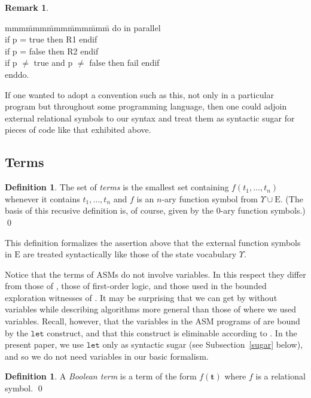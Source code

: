 \documentclass{LMCS}
\theoremstyle{definition}
\newtheorem{df}[thm]{Definition}
\newtheorem{rmk}[thm]{Remark}
\newenvironment{eatab}
 {\bigskip\noindent\begin{minipage}{\textwidth}\upshape\ttfamily
  \begin{tabbing}mmm\=mmm\=mmm\=mmm\=mmm\=\kill}
 {\end{tabbing}\end{minipage}\bigskip}
\newcommand{\E}{\mathrm{E}}
\newcommand{\U}{\Upsilon}
\newcommand{\bld}[1]{\ensuremath{\mathbf {#1}}}
\newcommand{\ttt}[1]{\ensuremath{\mathtt {#1}}}
\begin{document}
\begin{rmk}
  \begin{eatab}
     do in parallel\\
     \> if p = true then R1 endif\\
     \> if p = false then R2 endif\\
     \> if p $\ne$ true and p $\ne$ false then fail endif\\
     enddo.  \end{eatab}

If one wanted to adopt a convention such as this, not only in a
particular program but throughout some programming language, then
one could adjoin external relational symbols to our syntax and treat
them as syntactic sugar for pieces of code like that exhibited above.  
\end{rmk}

\subsection{Terms}

\begin{df}
  The set of \emph{terms} is the smallest set containing
  $f(t_1,\dots,t_n)$ whenever it contains $t_1,\dots,t_n$ and $f$ is
  an $n$-ary function symbol from $\U\cup\E$.  (The basis of
  this recusive definition is, of course, given by the 0-ary function
  symbols.)
\qed\end{df}

This definition formalizes the assertion above that the external
function symbols in $\E$ are treated syntactically like those of the
state vocabulary $\U$.

Notice that the terms of ASMs do not involve variables.  In this
respect they differ from those of \cite{oa2}, those of first-order
logic, and those used in the bounded exploration witnesses of
\cite{ga1}. It may be surprising that we can get by without
variables while describing algorithms more general than those of
\cite{oa2} where we used variables.  Recall, however, that the
variables in the ASM programs of \cite{oa2} are bound by the
\ttt{let} construct, and that this construct is eliminable according
to \cite[Section~7]{oa3}.  In the present paper, we use \ttt{let}
only as syntactic sugar (see Subsection~\ref{sugar} below), and so
we do not need variables in our basic formalism.

\begin{df}
  A \emph{Boolean term} is a term of the form $f(\bld t)$ where $f$ is
  a relational symbol.
\qed\end{df}
\end{document}
